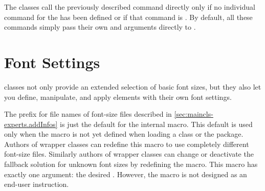 \begin{Declaration}
\end{Declaration}%
The \KOMAScript{} classes call the previously described
command
%
 directly only if no
individual command for the  has been defined or if that command
is . By default, all
these commands simply pass their own  and arguments directly to
.%
%
\EndIndexGroup


\section{Font Settings}

\KOMAScript{} classes not only provide an extended selection of basic font
sizes, but they also let you define, manipulate, and apply elements with
their own font settings.

\begin{Declaration}
\end{Declaration}
The  prefix for file names of font-size files described
in \autoref{sec:maincls-experts.addInfos} is just the default for the
internal  macro. This
default is used only when the macro is not yet defined when loading a
\KOMAScript{} class or the  package. Authors of wrapper
classes can redefine this macro to use completely different font-size files.
Similarly authors of wrapper classes can change or deactivate
the fallback solution for unknown font sizes by redefining the
 macro. This macro
has exactly one argument: the desired .
However, the  macro is not
designed as an end-user instruction.%
\EndIndexGroup


